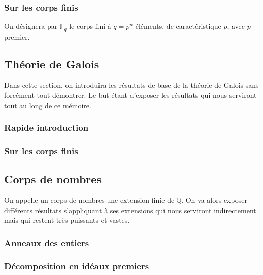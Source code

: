 \documentclass[a4paper]{article} %
\numberwithin{equation}{section}
\newcommand\GF[1]{\mathbb{F}_{#1}}
\begin{document}
\subsubsection{Sur les corps finis}
On désignera par $\GF{q}$ le corps fini à $q = p^n$ éléments, de caractéristique $p$, avec $p$ premier.




\subsection{Théorie de Galois}

Dans cette section, on introduira les résultats de base de la théorie de Galois sans forcément tout démontrer. Le but étant d'exposer les résultats qui nous serviront tout au long de ce mémoire.

\subsubsection{Rapide introduction}

\subsubsection{Sur les corps finis}

\subsection{Corps de nombres}

On appelle un corps de nombres une extension finie de $\mathbb{Q}$. On va alors exposer différents résultats s'appliquant à ses extensions qui nous serviront indirectement mais qui restent très puissants et vastes.

\subsubsection{Anneaux des entiers}

\subsubsection{Décomposition en idéaux premiers}
\end{document}
